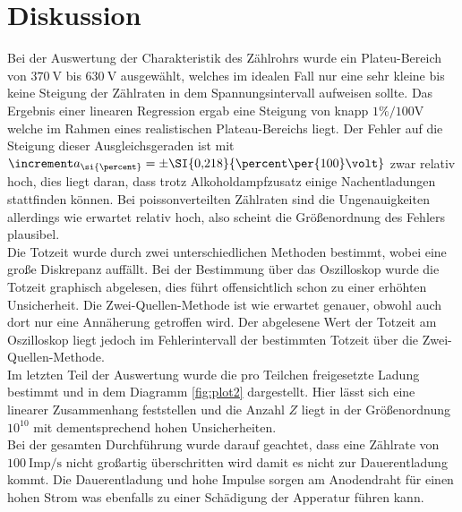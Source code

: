 \section{Diskussion}
\label{sec:Diskussion}

Bei der Auswertung der Charakteristik des Zählrohrs wurde ein Plateu-Bereich von $\SI{370}{\volt}$ bis $\SI{630}{\volt}$
ausgewählt, welches im idealen Fall nur eine sehr kleine bis keine Steigung der Zählraten in dem Spannungsintervall aufweisen sollte. Das Ergebnis einer linearen Regression ergab eine Steigung von 
knapp ${1}\si{\percent\per{100}\volt}$ welche im Rahmen eines realistischen Plateau-Bereichs liegt. Der Fehler auf die Steigung dieser Ausgleichsgeraden ist 
mit $\increment a_{\si{\percent}} = \pm \SI{0{,}218}{\percent\per{100}\volt}$ zwar relativ hoch, dies liegt daran, dass trotz Alkoholdampfzusatz einige Nachentladungen stattfinden können. 
Bei poissonverteilten Zählraten sind die Ungenauigkeiten allerdings wie erwartet relativ hoch, also scheint die Größenordnung des Fehlers plausibel.
\\
\newline
Die Totzeit wurde durch zwei unterschiedlichen Methoden bestimmt, wobei eine große Diskrepanz auffällt. Bei der Bestimmung über das Oszilloskop
wurde die Totzeit graphisch abgelesen, dies führt offensichtlich schon zu einer erhöhten Unsicherheit. Die Zwei-Quellen-Methode ist wie erwartet genauer, obwohl
auch dort nur eine Annäherung getroffen wird. Der abgelesene Wert der Totzeit am Oszilloskop liegt jedoch im Fehlerintervall der bestimmten Totzeit über die Zwei-Quellen-Methode.
\\
\newline
Im letzten Teil der Auswertung wurde die pro Teilchen freigesetzte Ladung bestimmt und in dem Diagramm \ref{fig:plot2} dargestellt. Hier lässt sich eine linearer Zusammenhang feststellen
und die Anzahl $Z$ liegt in der Größenordnung $10^{10}$ mit dementsprechend hohen Unsicherheiten. 
\\
\newline
Bei der gesamten Durchführung wurde darauf geachtet, dass eine Zählrate von $\SI{100}{{\text{Imp}}\per\second}$ nicht großartig überschritten wird damit es nicht zur Dauerentladung kommt.
Die Dauerentladung und hohe Impulse sorgen am Anodendraht für einen hohen Strom was ebenfalls zu einer Schädigung der Apperatur führen kann.
